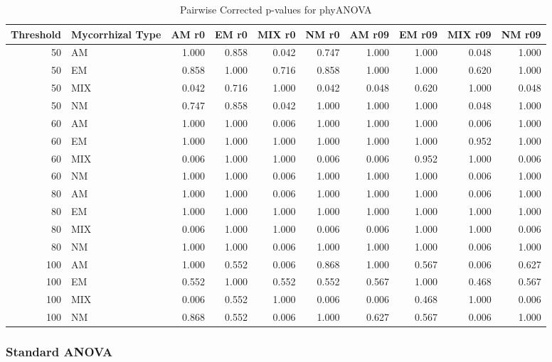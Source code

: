 \documentclass[]{article}
\begin{document}
\begin{table}[H]

\caption{\label{tab:unnamed-chunk-9}Pairwise Corrected p-values for phyANOVA}
\centering
\begin{tabular}{r|l|r|r|r|r|r|r|r|r}
\hline
Threshold & Mycorrhizal Type & AM r0 & EM r0 & MIX r0 & NM r0 & AM r09 & EM r09 & MIX r09 & NM r09\\
\hline
50 & AM & 1.000 & 0.858 & 0.042 & 0.747 & 1.000 & 1.000 & 0.048 & 1.000\\
\hline
50 & EM & 0.858 & 1.000 & 0.716 & 0.858 & 1.000 & 1.000 & 0.620 & 1.000\\
\hline
50 & MIX & 0.042 & 0.716 & 1.000 & 0.042 & 0.048 & 0.620 & 1.000 & 0.048\\
\hline
50 & NM & 0.747 & 0.858 & 0.042 & 1.000 & 1.000 & 1.000 & 0.048 & 1.000\\
\hline
60 & AM & 1.000 & 1.000 & 0.006 & 1.000 & 1.000 & 1.000 & 0.006 & 1.000\\
\hline
60 & EM & 1.000 & 1.000 & 1.000 & 1.000 & 1.000 & 1.000 & 0.952 & 1.000\\
\hline
60 & MIX & 0.006 & 1.000 & 1.000 & 0.006 & 0.006 & 0.952 & 1.000 & 0.006\\
\hline
60 & NM & 1.000 & 1.000 & 0.006 & 1.000 & 1.000 & 1.000 & 0.006 & 1.000\\
\hline
80 & AM & 1.000 & 1.000 & 0.006 & 1.000 & 1.000 & 1.000 & 0.006 & 1.000\\
\hline
80 & EM & 1.000 & 1.000 & 1.000 & 1.000 & 1.000 & 1.000 & 1.000 & 1.000\\
\hline
80 & MIX & 0.006 & 1.000 & 1.000 & 0.006 & 0.006 & 1.000 & 1.000 & 0.006\\
\hline
80 & NM & 1.000 & 1.000 & 0.006 & 1.000 & 1.000 & 1.000 & 0.006 & 1.000\\
\hline
100 & AM & 1.000 & 0.552 & 0.006 & 0.868 & 1.000 & 0.567 & 0.006 & 0.627\\
\hline
100 & EM & 0.552 & 1.000 & 0.552 & 0.552 & 0.567 & 1.000 & 0.468 & 0.567\\
\hline
100 & MIX & 0.006 & 0.552 & 1.000 & 0.006 & 0.006 & 0.468 & 1.000 & 0.006\\
\hline
100 & NM & 0.868 & 0.552 & 0.006 & 1.000 & 0.627 & 0.567 & 0.006 & 1.000\\
\hline
\end{tabular}
\end{table}

\hypertarget{standard-anova-1}{%
\subsubsection{Standard ANOVA}\label{standard-anova-1}}
\end{document}
